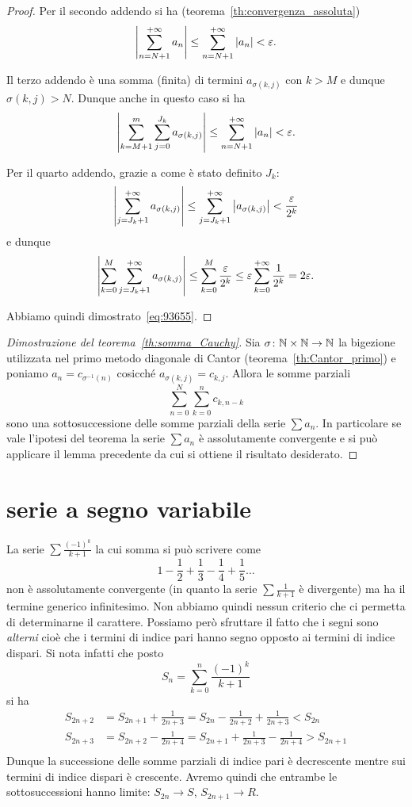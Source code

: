 \begin{proof}
Per il secondo addendo si ha (teorema~\ref{th:convergenza_assoluta})
\[
 {\left|\sum_{n=N+1}^{+\infty} a_n\right|}
 \le \sum_{n=N+1}^{+\infty} {\left|a_n\right|} < \varepsilon.
\]

Il terzo addendo è una somma (finita) di termini
$a_{\sigma(k,j)}$ con $k> M$ e dunque $\sigma(k,j)>N$.
Dunque anche in questo caso si ha
\[
{\left|\sum_{k=M+1}^{m} \sum_{j=0}^{J_k} a_{\sigma(k,j)}\right|}
\le\sum_{n=N+1}^{+\infty} {\left|a_n\right|}<\varepsilon.
\]

Per il quarto addendo, grazie a come è stato definito $J_k$:
\[
 {\left|\sum_{j=J_k+1}^{+\infty} a_{\sigma(k,j)}\right|}
 \le \sum_{j=J_k+1}^{+\infty} {\left|a_{\sigma(k,j)}\right|}
 < \frac{\varepsilon}{2^k}
\]
e dunque
\[
{\left|\sum_{k=0}^{M}\sum_{j=J_k+1}^{+\infty} a_{\sigma(k,j)}\right|}
\le \sum_{k=0}^{M} \frac{\varepsilon}{2^k}
\le \varepsilon \sum_{k=0}^{+\infty}\frac{1}{2^k} = 2\varepsilon.
\]

Abbiamo quindi dimostrato~\eqref{eq:93655}.
\end{proof}

\begin{proof}[Dimostrazione del teorema~\ref{th:somma_Cauchy}]
Sia $\sigma\colon \mathbb N\times \mathbb N\to \mathbb N$ la bigezione utilizzata
nel primo metodo diagonale di Cantor (teorema~\ref{th:Cantor_primo})
e poniamo $a_n = c_{\sigma^{-1}(n)}$ cosicché
$a_{\sigma(k,j)} = c_{k,j}$.
Allora le somme parziali
\[
  \sum_{n=0}^N \sum_{k=0}^n c_{k,n-k}
\]
sono una sottosuccessione delle somme parziali della serie
$\sum a_n$.
In particolare se vale l'ipotesi del teorema la serie
$\sum a_n$ è assolutamente convergente e si può applicare
il lemma precedente da cui si ottiene il risultato desiderato.
\end{proof}

\section{serie a segno variabile}

La serie $\sum \frac{(-1)^k}{k+1}$ la cui somma si può scrivere come
\[
1 - \frac{1}{2} + \frac{1}{3} - \frac{1}{4} +  \frac{1}{5} \dots
\]
non è assolutamente convergente
(in quanto la serie $\sum \frac 1 {k+1}$ è divergente) ma ha il termine generico
infinitesimo. Non abbiamo quindi nessun criterio che ci permetta di
determinarne il carattere.
Possiamo però sfruttare il fatto che i segni sono \emph{alterni} cioè
che i termini di indice pari hanno segno opposto ai termini di indice dispari. Si nota infatti che posto
\[
  S_n = \sum_{k=0}^n \frac{(-1)^k}{k+1}
\]
si ha
\begin{align*}
S_{2n+2}
  &= S_{2n+1} + \frac{1}{2n+3}
  = S_{2n} - \frac{1}{2n+2} + \frac{1}{2n+3}
  < S_{2n}\\
S_{2n+3}
  &= S_{2n+2} - \frac{1}{2n+4}
  = S_{2n+1} + \frac{1}{2n+3} - \frac{1}{2n+4}
  > S_{2n+1} \\
\end{align*}
Dunque la successione delle somme parziali di indice pari è decrescente mentre
sui termini di indice dispari è crescente. Avremo quindi che entrambe
le sottosuccessioni hanno limite: $S_{2n} \to S$, $S_{2n+1} \to R$.

